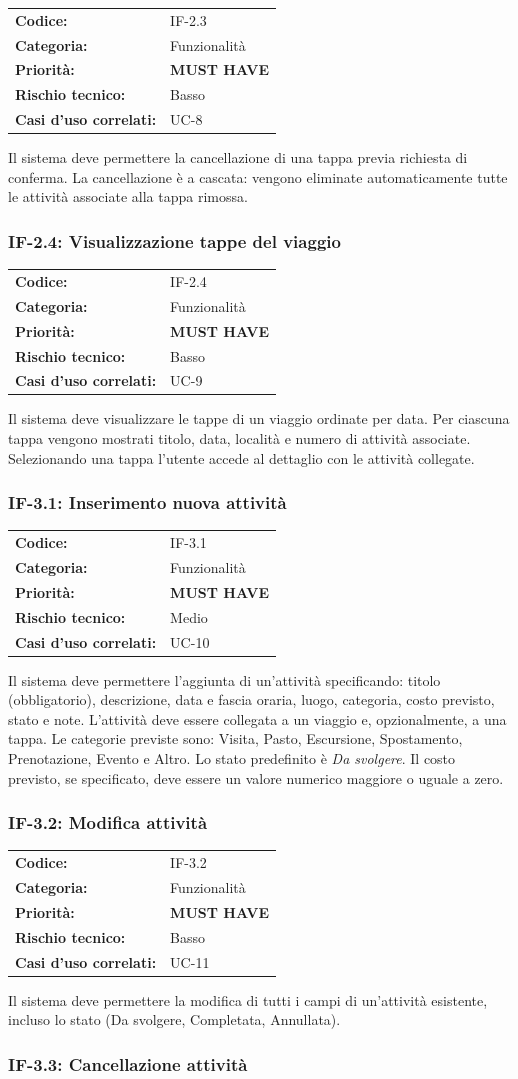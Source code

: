 \documentclass[12pt, a4paper]{article}
\makeatletter
\newcommand{\reqblock}[5]{%
  \begin{tabular}{@{}ll@{}}
    \toprule
    \textbf{Codice:}              & #1 \\
    \textbf{Categoria:}           & #2 \\
    \textbf{Priorità:}            & #3 \\
    \textbf{Rischio tecnico:}     & #4 \\
    \textbf{Casi d'uso correlati:}& #5 \\
    \bottomrule
  \end{tabular}
}
\newcommand{\MUST}{\colorbox{musthave}{\small\textbf{MUST HAVE}}}
\newcommand{\RISKL}{\colorbox{risklow}{\small Basso}}
\newcommand{\RISKM}{\colorbox{riskmed}{\small Medio}}
\makeatother
\begin{document}
\medskip
\reqblock{IF-2.3}{Funzionalità}{\MUST}{\RISKL}{UC-8}
\medskip

\noindent
Il sistema deve permettere la cancellazione di una tappa previa richiesta di conferma.
La cancellazione è a cascata: vengono eliminate automaticamente tutte le attività
associate alla tappa rimossa.

\subsubsection{IF-2.4: Visualizzazione tappe del viaggio}

\medskip
\reqblock{IF-2.4}{Funzionalità}{\MUST}{\RISKL}{UC-9}
\medskip

\noindent
Il sistema deve visualizzare le tappe di un viaggio ordinate per data. Per ciascuna
tappa vengono mostrati titolo, data, località e numero di attività associate.
Selezionando una tappa l'utente accede al dettaglio con le attività collegate.

\subsubsection{IF-3.1: Inserimento nuova attività}

\medskip
\reqblock{IF-3.1}{Funzionalità}{\MUST}{\RISKM}{UC-10}
\medskip

\noindent
Il sistema deve permettere l'aggiunta di un'attività specificando: titolo (obbligatorio),
descrizione, data e fascia oraria, luogo, categoria, costo previsto, stato e note.
L'attività deve essere collegata a un viaggio e, opzionalmente, a una tappa. Le categorie
previste sono: Visita, Pasto, Escursione, Spostamento, Prenotazione, Evento e Altro.
Lo stato predefinito è \textit{Da svolgere}. Il costo previsto, se specificato, deve
essere un valore numerico maggiore o uguale a zero.

\subsubsection{IF-3.2: Modifica attività}

\medskip
\reqblock{IF-3.2}{Funzionalità}{\MUST}{\RISKL}{UC-11}
\medskip

\noindent
Il sistema deve permettere la modifica di tutti i campi di un'attività esistente,
incluso lo stato (Da svolgere, Completata, Annullata).

\subsubsection{IF-3.3: Cancellazione attività}
\end{document}
